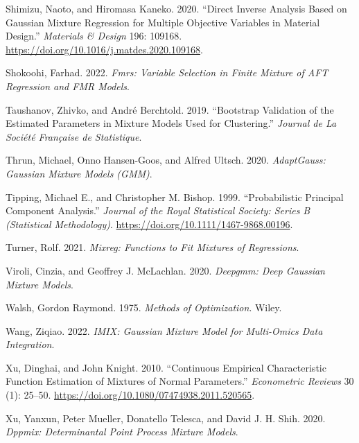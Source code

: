 \begin{CSLReferences}{1}{0}
\leavevmode{}%
Shimizu, Naoto, and Hiromasa Kaneko. 2020. {``Direct Inverse Analysis Based on {Gaussian} Mixture Regression for Multiple Objective Variables in Material Design.''} \emph{Materials \& Design} 196: 109168. \url{https://doi.org/10.1016/j.matdes.2020.109168}.

\leavevmode{}%
Shokoohi, Farhad. 2022. \emph{Fmrs: Variable Selection in Finite Mixture of AFT Regression and FMR Models}.

\leavevmode{}%
Taushanov, Zhivko, and André Berchtold. 2019. {``Bootstrap Validation of the Estimated Parameters in Mixture Models Used for Clustering.''} \emph{Journal de La Société Française de Statistique}.

\leavevmode{}%
Thrun, Michael, Onno Hansen-Goos, and Alfred Ultsch. 2020. \emph{AdaptGauss: Gaussian Mixture Models (GMM)}.

\leavevmode{}%
Tipping, Michael E., and Christopher M. Bishop. 1999. {``Probabilistic {Principal} {Component} {Analysis}.''} \emph{Journal of the Royal Statistical Society: Series B (Statistical Methodology)}. \url{https://doi.org/10.1111/1467-9868.00196}.

\leavevmode{}%
Turner, Rolf. 2021. \emph{Mixreg: Functions to Fit Mixtures of Regressions}.

\leavevmode{}%
Viroli, Cinzia, and Geoffrey J. McLachlan. 2020. \emph{Deepgmm: Deep Gaussian Mixture Models}.

\leavevmode{}%
Walsh, Gordon Raymond. 1975. \emph{Methods of {Optimization}}. {Wiley}.

\leavevmode{}%
Wang, Ziqiao. 2022. \emph{IMIX: Gaussian Mixture Model for Multi-Omics Data Integration}.

\leavevmode{}%
Xu, Dinghai, and John Knight. 2010. {``Continuous {Empirical Characteristic Function Estimation} of {Mixtures} of {Normal Parameters}.''} \emph{Econometric Reviews} 30 (1): 25--50. \url{https://doi.org/10.1080/07474938.2011.520565}.

\leavevmode{}%
Xu, Yanxun, Peter Mueller, Donatello Telesca, and David J. H. Shih. 2020. \emph{Dppmix: Determinantal Point Process Mixture Models}.


\end{CSLReferences}
